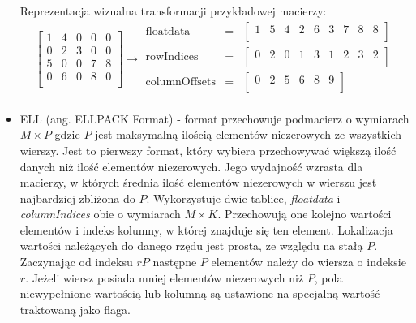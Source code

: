 \begin{itemize}
    Reprezentacja wizualna transformacji przykładowej macierzy:
    \[
\left[
\begin{array}{ccccc}
    1 & 4 & 0 & 0 & 0\\ 
    0 & 2 & 3 & 0 & 0\\ 
    5 & 0 & 0 & 7 & 8\\ 
    0 & 6 & 0 & 8 & 0\\ 
\end{array}
\right]
\rightarrow
\begin{matrix}
\text{floatdata} & = & \begin{bmatrix}
1 & 5 & 4 & 2 & 6 & 3 & 7 & 8 & 8 \\
\end{bmatrix} \\
\text{rowIndices} & = & \begin{bmatrix}
0 & 2 & 0 & 1 & 3 & 1 & 2 & 3 & 2 \\
\end{bmatrix} \\
\text{columnOffsets} & = & \begin{bmatrix}
0 & 2 & 5 & 6 & 8 & 9 \\
\end{bmatrix} \\
\end{matrix}
\]
    
    \item ELL (ang. ELLPACK Format) - format przechowuje podmacierz o wymiarach $M \times P$ gdzie $P$ jest maksymalną ilością elementów niezerowych ze wszystkich wierszy. 
    Jest to pierwszy format, który wybiera przechowywać większą ilość danych niż ilość elementów niezerowych.
    Jego wydajność wzrasta dla macierzy, w których średnia ilość elementów niezerowych w wierszu jest najbardziej zbliżona do $P$.
    Wykorzystuje dwie tablice, \textit{floatdata} i \textit{columnIndices} obie o wymiarach $M \times K$.
    Przechowują one kolejno wartości elementów i indeks kolumny, w której znajduje się ten element.
    Lokalizacja wartości należących do danego rzędu jest prosta, ze względu na stałą $P$.
    Zaczynając od indeksu $rP$ następne $P$ elementów należy do wiersza o indeksie $r$.
    Jeżeli wiersz posiada mniej elementów niezerowych niż $P$, pola niewypełnione wartością lub kolumną są ustawione na specjalną wartość traktowaną jako flaga.
    

\end{itemize}

